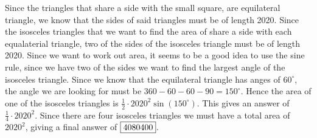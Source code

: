\begin{solution}\hfil\medskip
    
Since the triangles that share a side with the small square, are equilateral triangle, we know that the sides of said triangles must be of length 2020. Since the isosceles triangles that we want to find the area of share a side with each equalaterial triangle, two of the sides of the isosceles triangle must be of length 2020. Since we want to work out area, it seems to be a good idea to use the sine rule, since we have two of the sides we want to find the largest angle of the isosceles triangle. Since we know that the equilateral triangle has anges of \(60^{\circ}\), the angle we are looking for must be \(360-60-60-90=150^{\circ}\). Hence the area of one of the isosceles triangles is \(\frac{1}{2}\cdot 2020^2\sin(150^{\circ})\). This gives an answer of \(\frac{1}{4}\cdot2020^2\). Since there are four isosceles triangles we must have a total area of \(2020^2\), giving a final answer of \(\fbox{4080400}\).
\end{solution}\bigskip

